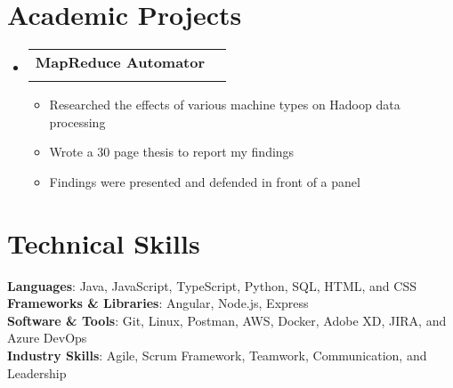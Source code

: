 \documentclass[letterpaper,12pt]{article}
\makeatletter
\newcommand{\resumeItem}[1]{
  \item\small{
    {#1 \vspace{-1pt}}
  }
}
\newcommand{\resumeSubheading}[4]{
  \vspace{2pt}\item
    \begin{tabular*}{0.97\textwidth}[t]{l@{\extracolsep{\fill}}r}
      \textbf{#1} & #2 \\
      \textit{\small#3} & \textit{\small #4} \\
    \end{tabular*}\vspace{-7pt}
}
\newcommand{\resumeSubHeadingListStart}{\begin{itemize}[leftmargin=0.15in, label={}]}
\newcommand{\resumeSubHeadingListEnd}{\end{itemize}}
\newcommand{\resumeItemListStart}{\begin{itemize}}
\newcommand{\resumeItemListEnd}{\end{itemize}\vspace{5pt}}
\makeatother
\begin{document}
\section{Academic Projects}
\resumeSubHeadingListStart
\resumeSubheading
{\textbf{MapReduce Automator}}{}
{}{}\vspace{-15pt}
\resumeItemListStart
\resumeItem{Researched the effects of various machine types on Hadoop data processing}
\resumeItem{Wrote a 30 page thesis to report my findings}
\resumeItem{Findings were presented and defended in front of a panel}
\resumeItemListEnd
\resumeSubHeadingListEnd


\section{Technical Skills}
\begin{itemize}[leftmargin=0.15in, label={}]
\small{\item{
\textbf{Languages}{: Java, JavaScript, TypeScript, Python, SQL, HTML, and CSS} \\
\textbf{Frameworks \& Libraries}{: Angular, Node.js, Express} \\
\textbf{Software \& Tools}{: Git, Linux, Postman, AWS, Docker, Adobe XD, JIRA, and Azure DevOps} \\
\textbf{Industry Skills}{:  Agile, Scrum Framework, Teamwork, Communication, and Leadership} \\
}}
\end{itemize}


\end{document}

